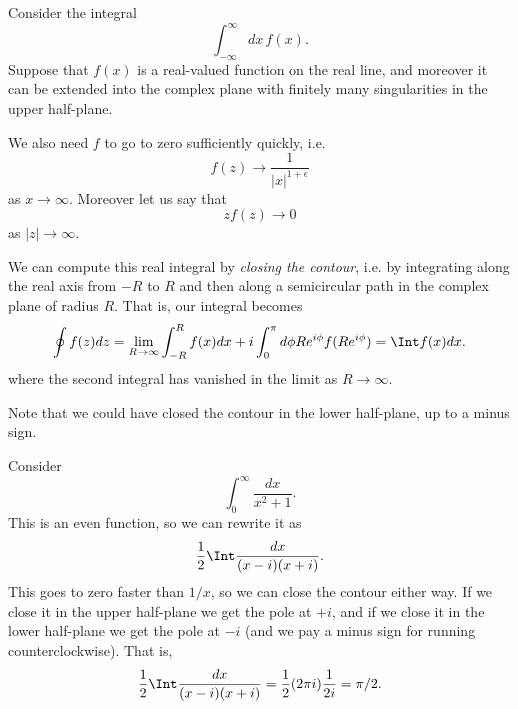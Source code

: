 \begin{exm}
    Consider the integral
    \begin{equation}
        \int_{-\infty}^\infty dx \,f(x).
    \end{equation}
    Suppose that $f(x)$ is a real-valued function on the real line, and moreover it can be extended into the complex plane with finitely many singularities in the upper half-plane.
    
    We also need $f$ to go to zero sufficiently quickly, i.e.
    \begin{equation}
        f(z) \to \frac{1}{|x|^{1+\epsilon}}
    \end{equation}
    as $x\to \infty$. Moreover let us say that
    \begin{equation}
        zf(z) \to 0
    \end{equation}
    as $|z|\to \infty$.
    
    We can compute this real integral by \emph{closing the contour}, i.e. by integrating along the real axis from $-R$ to $R$ and then along a semicircular path in the complex plane of radius $R$. That is, our integral becomes
    \begin{equation}
        \oint f(z)dz = \lim_{R\to \infty} \int_{-R}^R f(x) dx + i \int_0^\pi d\phi R e^{i\phi} f(Re^{i\phi})= \Int f(x)dx.
    \end{equation}
    where the second integral has vanished in the limit as $R\to \infty$.
    
    Note that we could have closed the contour in the lower half-plane, up to a minus sign.
\end{exm}

\begin{exm}
    Consider
    \begin{equation}
        \int_0^\infty \frac{dx}{x^2+1}.
    \end{equation}
    This is an even function, so we can rewrite it as
    \begin{equation}
        \frac{1}{2} \Int \frac{dx}{(x-i)(x+i)}.
    \end{equation}
    This goes to zero faster than $1/x$, so we can close the contour either way. If we close it in the upper half-plane we get the pole at $+i$, and if we close it in the lower half-plane we get the pole at $-i$ (and we pay a minus sign for running counterclockwise). That is,
    \begin{equation}
        \frac{1}{2} \Int \frac{dx}{(x-i)(x+i)} =\frac{1}{2} (2\pi i) \frac{1}{2i}= \pi/2.
    \end{equation}
\end{exm}

